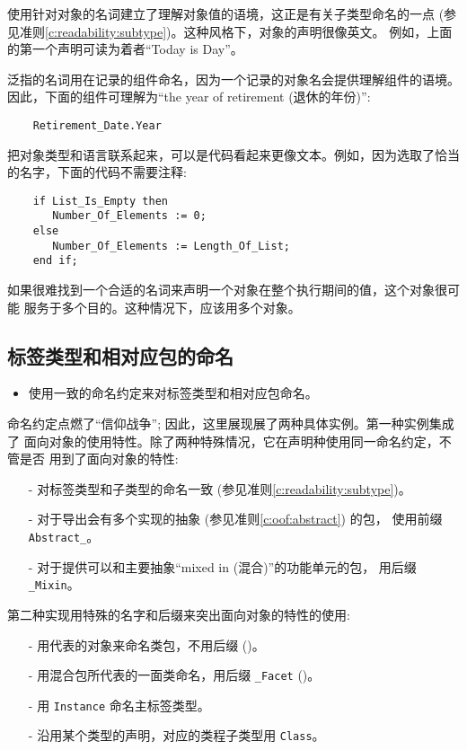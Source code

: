 \begin{blockindent}
使用针对对象的名词建立了理解对象值的语境，这正是有关子类型命名的一点
(参见准则\ref{c:readability:subtype})。这种风格下，对象的声明很像英文。
例如，上面的第一个声明可读为着者``Today is Day''。

泛指的名词用在记录的组件命名，因为一个记录的对象名会提供理解组件的语境。
因此，下面的组件可理解为``the year of retirement (退休的年份)'':
\begin{lstlisting}
    Retirement_Date.Year
\end{lstlisting}
把对象类型和语言联系起来，可以是代码看起来更像文本。例如，因为选取了恰当
的名字，下面的代码不需要注释:
\begin{lstlisting}
    if List_Is_Empty then
       Number_Of_Elements := 0;
    else
       Number_Of_Elements := Length_Of_List;
    end if;
\end{lstlisting}
\end{blockindent}

\begin{blockindent}
如果很难找到一个合适的名词来声明一个对象在整个执行期间的值，这个对象很可能
服务于多个目的。这种情况下，应该用多个对象。
\end{blockindent}

\subsection{标签类型和相对应包的命名}
\label{c:readability:tag}
\begin{itemize}
    \item 使用一致的命名约定来对标签类型和相对应包命名。
\end{itemize}

\begin{blockindent}
命名约定点燃了``信仰战争''; 因此，这里展现展了两种具体实例。第一种实例集成了
面向对象的使用特性。除了两种特殊情况，它在声明种使用同一命名约定，不管是否
用到了面向对象的特性:
\begin{itemize}
    \item[-] 对标签类型和子类型的命名一致
(参见准则\ref{c:readability:subtype})。
    \item[-] 对于导出会有多个实现的抽象 (参见准则\ref{c:oof:abstract}) 的包，
使用前缀 \texttt{Abstract\_}。
    \item[-] 对于提供可以和主要抽象``mixed in (混合)''的功能单元的包，
用后缀 \texttt{\_Mixin}。
\end{itemize}
第二种实现用特殊的名字和后缀来突出面向对象的特性的使用:
\begin{itemize}
    \item[-] 用代表的对象来命名类包，不用后缀 (\cite{rosen95})。
    \item[-] 用混合包所代表的一面类命名，用后缀 \texttt{\_Facet}
	     (\cite{rosen95})。
    \item[-] 用 \texttt{Instance} 命名主标签类型。
    \item[-] 沿用某个类型的声明，对应的类程子类型用 \texttt{Class}。
\end{itemize}
\end{blockindent}


